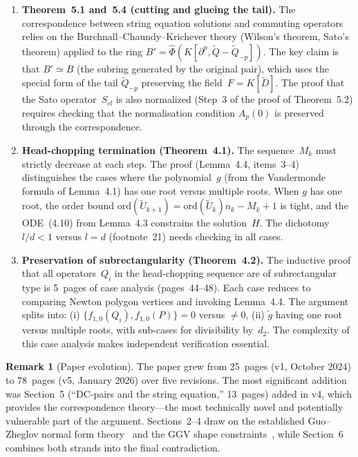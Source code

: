 \documentclass[12pt,a4paper]{article}
\theoremstyle{definition}
\newtheorem{remark}[theorem]{Remark}
\begin{document}
\begin{enumerate}[label=(\alph*)]
\item \textbf{Theorem~5.1 and~5.4 (cutting and glueing the tail).}
  The correspondence between string equation solutions and commuting
  operators relies on the Burchnall--Chaundy--Krichever theory
  (Wilson's theorem, Sato's theorem) applied to the ring
  $B' = \hat{\Phi}(K[\partial^p, \widetilde{Q} - \widetilde{Q}_{-p}])$.
  The key claim is that $B' \simeq B$ (the subring generated by the
  original pair), which uses the special form of the tail
  $\widetilde{Q}_{-p}$ preserving the field~$F = K[\widetilde{D}]$.
  The proof that the Sato operator~$S_{cl}$ is also normalized
  (Step~3 of the proof of Theorem~5.2) requires checking that the
  normalisation condition $A_p(0)$ is preserved through the
  correspondence.

\item \textbf{Head-chopping termination (Theorem~4.1).}
  The sequence~$M_k$ must strictly decrease at each step.  The proof
  (Lemma~4.4, items~3--4) distinguishes the cases where the
  polynomial~$g$ (from the Vandermonde formula of Lemma~4.1) has one
  root versus multiple roots.  When $g$ has one root, the order
  bound $\mathrm{ord}(\widetilde{U}_{k+1}) =
  \mathrm{ord}(\widetilde{U}_k)n_k - M_k + 1$ is tight, and the
  ODE~(4.10) from Lemma~4.3 constrains the solution~$H$.  The
  dichotomy $l/d < 1$ versus $l = d$ (footnote~21) needs checking in
  all cases.

\item \textbf{Preservation of subrectangularity (Theorem~4.2).}
  The inductive proof that all operators~$Q_i$ in the head-chopping
  sequence are of subrectangular type is 5~pages of case analysis
  (pages~44--48).  Each case reduces to comparing Newton polygon
  vertices and invoking Lemma~4.4.  The argument splits into: (i)
  $\{f_{1,0}(Q_i), f_{1,0}(P)\} = 0$ versus $\neq 0$, (ii)
  $\tilde{g}$ having one root versus multiple roots, with sub-cases
  for divisibility by~$d_2$.  The complexity of this case analysis
  makes independent verification essential.
\end{enumerate}

\begin{remark}[Paper evolution]
The paper grew from 25~pages (v1, October 2024) to 78~pages (v5,
January 2026) over five revisions.  The most significant addition was
Section~5 (``DC-pairs and the string equation,'' 13~pages) added in
v4, which provides the correspondence theory---the most technically
novel and potentially vulnerable part of the argument.  Sections~2--4
draw on the established Guo--Zheglov normal form
theory~\cite{GuoZheglov1, GuoZheglov2, GuoZheglov3} and the
GGV shape constraints~\cite{GGV}, while Section~6 combines both
strands into the final contradiction.
\end{remark}
\end{document}
